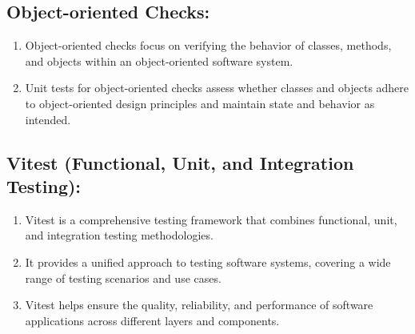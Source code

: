 \documentclass{article}
\begin{document}
\subsection{Object-oriented Checks:}
\begin{enumerate}[label=\arabic*.]
    \item Object-oriented checks focus on verifying the behavior of classes, methods, and objects within an object-oriented software system.
    \item Unit tests for object-oriented checks assess whether classes and objects adhere to object-oriented design principles and maintain state and behavior as intended.
\end{enumerate}

\subsection{Vitest (Functional, Unit, and Integration Testing):}
\begin{enumerate}[label=\arabic*.]
    \item Vitest is a comprehensive testing framework that combines functional, unit, and integration testing methodologies.
    \item It provides a unified approach to testing software systems, covering a wide range of testing scenarios and use cases.
    \item Vitest helps ensure the quality, reliability, and performance of software applications across different layers and components.
\end{enumerate}
\end{document}
